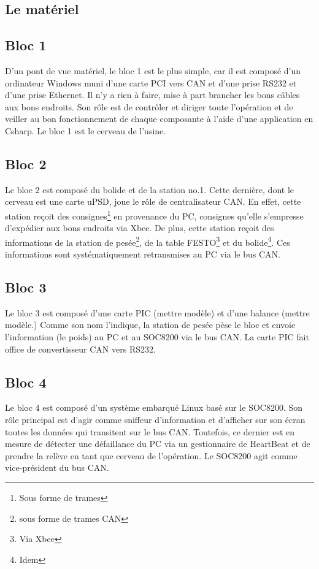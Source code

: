 \documentclass[10pt,a4paper,final]{article}
\begin{document}
\begin{spacing}{1.5}


\pagebreak

\section{Le matériel}

\subsection{Bloc 1}
D'un pont de vue matériel, le bloc 1 est le plus simple, car il est composé d'un ordinateur Windows muni d'une carte PCI vers CAN et d'une prise RS232 et d'une prise Ethernet. Il n'y a rien à faire, mise à part brancher les bons câbles aux bons endroits. Son rôle est de contrôler et diriger toute l'opération et de veiller au bon fonctionnement de chaque composante à l'aide d'une application en Csharp. Le bloc 1 est le cerveau de l'usine.

\subsection{Bloc 2}
Le bloc 2 est composé du bolide et de la station no.1. Cette dernière, dont le cerveau est une carte uPSD, joue le rôle de centralisateur CAN. En effet, cette station reçoit des consignes\footnote{Sous forme de trames} en provenance du PC, consignes qu'elle s'empresse d'expédier aux bons endroits via Xbee. De plus, cette station reçoit des informations de la station de pesée\footnote{sous forme de trames CAN}, de la table FESTO\footnote{Via Xbee} et du bolide\footnote{Idem}. Ces informations sont systématiquement retransmises au PC via le bus CAN.

\subsection{Bloc 3}
Le bloc 3 est composé d'une carte PIC (mettre modèle) et d'une balance (mettre modèle.) Comme son nom l'indique, la station de pesée pèse le bloc et envoie l'information (le poids) au PC et au SOC8200 via le bus CAN. La carte PIC fait office de convertisseur CAN vers RS232.

\subsection{Bloc 4}
Le bloc 4 est composé d'un système embarqué Linux basé sur le SOC8200. Son rôle principal est d'agir comme sniffeur d'information et d'afficher sur son écran toutes les données qui transitent sur le bus CAN. Toutefois, ce dernier est en mesure de détecter une défaillance du PC via un gestionnaire de HeartBeat et de prendre la relève en tant que cerveau de l'opération. Le SOC8200 agit comme vice-président du bus CAN.


\end{spacing}
\end{document}
